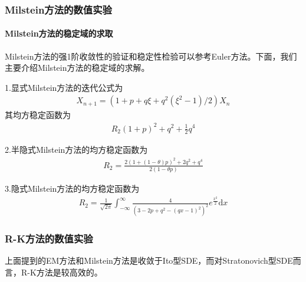         \subsubsection{Milstein方法的数值实验}
            \label{subsubsec:Milstein方法的数值实验}
            \paragraph{Milstein方法的稳定域的求取}
            Milstein方法的强1阶收敛性的验证和稳定性检验可以参考Euler方法。下面，我们主要介绍Milstein方法的稳定域的求解。
            \par
            1.显式Milstein方法的迭代公式为
            \begin{align*}
            X_{n+1} = (1+p+q\xi+q^2(\xi^2 - 1)/2)X_n
            \end{align*}
            其均方稳定函数为
            \begin{align*}
            R_2(1+p)^2 + q^2 + \frac 12 q^4
            \end{align*}
            \par
            2.半隐式Milstein方法的均方稳定函数为
            \begin{align*}
            R_2 = \frac{2(1+(1-\theta)p)^2 + 2q^2 + q^4}{2(1-\theta p)}
            \end{align*}
            \par
            3.隐式Milstein方法的均方稳定函数为
            \begin{align*}
            R_2 = \frac{1}{\sqrt{2 \pi}}\int_{-\infty}^{\infty} \frac{4}{(3-2p+q^2-(qx-1)^2)^2}e^{\frac{x^2}{2}}\mathrm{d}x
            \end{align*}

        \subsubsection{R-K方法的数值实验}
            \label{subsubsec:R-K方法的数值实验}
            上面提到的EM方法和Milstein方法是收敛于Ito型SDE，而对Stratonovich型SDE而言，R-K方法是较高效的。
